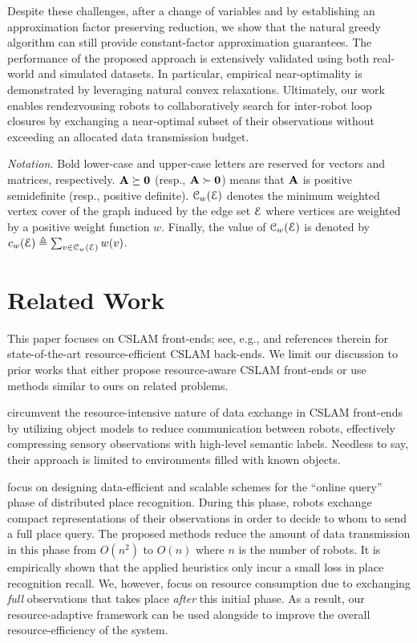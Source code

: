 \documentclass[conference]{IEEEtran}
\begin{document}
Despite these challenges, after a change of variables and by
establishing an approximation factor preserving reduction, we show that the natural greedy algorithm 
can still provide constant-factor approximation guarantees. 
The performance of the proposed approach is extensively validated using both real-world and simulated datasets. 
In particular, empirical near-optimality is demonstrated by leveraging natural
convex relaxations.
Ultimately, our work enables
rendezvousing robots to collaboratively search for inter-robot loop
closures by exchanging a near-optimal subset of their
observations without exceeding an allocated data transmission budget.


\vspace{0.1cm}
\noindent\emph{Notation.} 
Bold lower-case and upper-case letters are reserved for vectors and matrices, respectively.
$\mathbf{A} \succeq \mathbf{0}$ (resp., $\mathbf{A} \succ \mathbf{0}$) means that $\mathbf{A}$ is
positive semidefinite (resp., positive definite).
$\mathcal{C}_w(\mathcal{E})$ denotes the minimum weighted vertex cover of the graph induced by 
the edge set $\mathcal{E}$ where vertices are weighted by a positive weight function $w$.
Finally, the value of $\mathcal{C}_w(\mathcal{E})$ is denoted by $c_w(\mathcal{E}) \triangleq \sum_{v
\in \mathcal{C}_w(\mathcal{E})} w(v)$.

\section{Related Work}
\label{sec:related}

This paper focuses on CSLAM front-ends; see, e.g.,
\cite{saeedi2016multiple,choudhary2017,nerurkar2009distributed} and references therein for
state-of-the-art resource-efficient CSLAM back-ends. We limit our discussion 
to prior works that either propose resource-aware CSLAM front-ends or use methods similar to 
ours on related problems.

\citet{choudhary2017} circumvent the resource-intensive nature of data exchange
in CSLAM front-ends by utilizing object models to reduce communication between robots, effectively 
compressing sensory observations with high-level semantic labels. Needless to
say, their approach is limited to environments filled with known objects.

\citet{CieslewskiS17,cieslewski2017efficient} 
focus on designing data-efficient and scalable schemes for the ``online query''
phase of distributed place recognition.
During this phase,
robots exchange compact representations of their observations 
in order to decide to whom to send a full place query. 
The proposed methods reduce the amount of data transmission in this phase
from $O(n^2)$ to
$O(n)$ where $n$ is the number of robots.
It is empirically shown that the applied heuristics only incur a 
small loss in place recognition recall.
We, however, focus on resource consumption due to 
exchanging \emph{full} observations that takes place \emph{after} this initial phase. 
As a result,
our resource-adaptive framework can be used alongside
\cite{cieslewski2017efficient,CieslewskiS17,CieslewskiChoudhary17}
to improve the overall resource-efficiency of 
the system.
\end{document}
